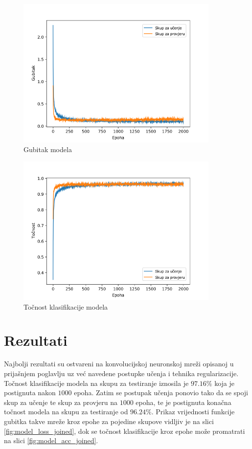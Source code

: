 \begin{figure}[!ht]
    \centering
    \includegraphics[width=10cm]{images/loss_prejoined.png}
    \caption{Gubitak modela}
    \label{fig:model_loss}
\end{figure}

\begin{figure}[!ht]
    \centering
    \includegraphics[width=10cm]{images/acc_prejoined.png}
    \caption{Točnost klasifikacije modela}
    \label{fig:model_acc}
\end{figure}

\section{Rezultati}

Najbolji rezultati su ostvareni na konvolucijskoj neuronskoj mreži opisanoj u prijašnjem poglavlju uz već navedene postupke učenja i tehnika regularizacije. Točnost klasifikacije modela na skupu za testiranje iznosila je $97.16 \%$ koja je postignuta nakon $1000$ epoha. Zatim se postupak učenja ponovio tako da se spoji skup za učenje te skup za provjeru na $1000$ epoha, te je postignuta konačna točnost modela na skupu za testiranje od $96.24 \%$. Prikaz vrijednosti funkcije gubitka takve mreže kroz epohe za pojedine skupove vidljiv je na slici \ref{fig:model_loss_joined}, dok se točnost klasifikacije kroz epohe može promatrati na slici \ref{fig:model_acc_joined}.

